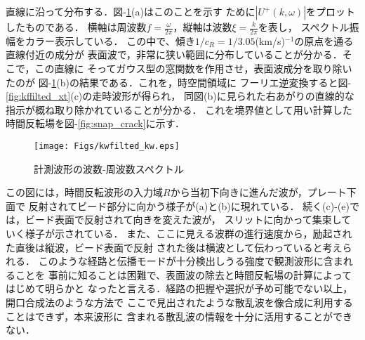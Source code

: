 直線に沿って分布する．{\rm 図}-\ref{fig:kwfilted_kw}(a)はこのことを示す
ために$|U^+(k,\omega)|$をプロットしたものである．
横軸は周波数$f=\frac{\omega}{2\pi}$，縦軸は波数$\xi=\frac{k}{2\pi}$を表し，
スペクトル振幅をカラー表示している．
この中で、傾き$1/c_R=1/3.05$(km/s)$^{-1}$の原点を通る直線付近の成分が
表面波で，非常に狭い範囲に分布していることが分かる．そこで，この直線に
そってガウス型の窓関数を作用させ，表面波成分を取り除いたのが
{\rm 図}-\ref{fig:kwfilted_kw}(b)の結果である．これを，時空間領域に
フーリエ逆変換すると{\rm 図}-\ref{fig:kffilted_xt}(c)の走時波形が得られ，
同図(b)に見られた右あがりの直線的な指示が概ね取り除かれていることが分かる．
これを境界値として用い計算した時間反転場を{\rm 図}-\ref{fig:snap_crack}に示す．
\begin{figure}[htb]
\centering
	\texttt{[image: Figs/kwfilted\_kw.eps]}
	\caption{計測波形の波数-周波数スペクトル}
	\label{fig:kwfilted_kw}
\end{figure}
この図には，時間反転波形の入力域$R$から当初下向きに進んだ波が，プレート下面で
反射されてビード部分に向かう様子が(a)と(b)に現れている．
続く(c)-(e)では，ビード表面で反射されて向きを変えた波が，
スリットに向かって集束していく様子が示されている．
また、ここに見える波群の進行速度から，励起された直後は縦波，ビード表面で反射
された後は横波として伝わっていると考えられる．
このような経路と伝播モードが十分検出しうる強度で観測波形に含まれることを
事前に知ることは困難で、表面波の除去と時間反転場の計算によってはじめて明らかと
なったと言える．経路の把握や選択が予め可能でない以上，開口合成法のような方法で
ここで見出されたような散乱波を像合成に利用することはできず，本来波形に
含まれる散乱波の情報を十分に活用することができない．

